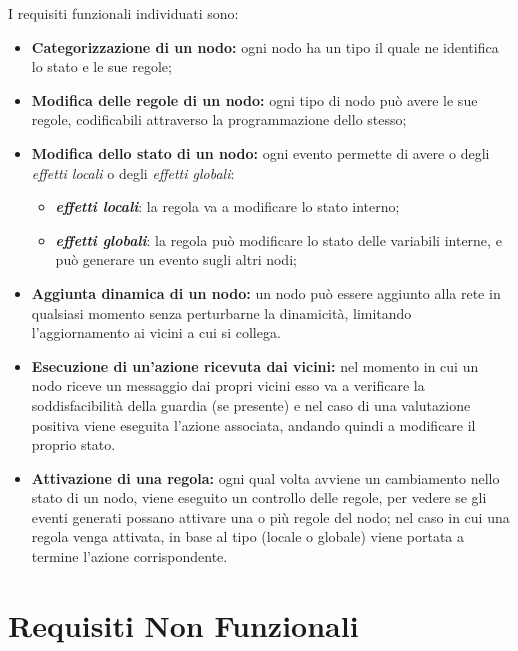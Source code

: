 \documentclass{memoir}
\begin{document}
I requisiti funzionali individuati sono:
\begin{itemize}
\item \textbf{Categorizzazione di un nodo:} ogni nodo ha un tipo il quale ne identifica lo stato e le sue regole;
\item \textbf{Modifica delle regole di un nodo:} ogni tipo di nodo può avere le sue regole, codificabili attraverso la programmazione dello stesso;
\item \textbf{Modifica dello stato di un nodo:} ogni evento permette di avere o degli \textit{effetti locali} o degli \textit{effetti globali}:
	\begin{itemize}
	\item \textit{\textbf{effetti locali}}: la regola va a modificare lo stato interno;
	\item \textit{\textbf{effetti globali}}: la regola può modificare lo stato delle variabili interne, e può generare un evento sugli altri nodi;
	\end{itemize}
\item \textbf{Aggiunta dinamica di un nodo:} un nodo può essere aggiunto alla rete in qualsiasi momento senza perturbarne la dinamicità, limitando l'aggiornamento ai vicini a cui si collega.
\item \textbf{Esecuzione di un'azione ricevuta dai vicini:} nel momento in cui un nodo riceve un messaggio dai propri vicini esso va a verificare la soddisfacibilità della guardia (se presente) e nel caso di una valutazione positiva viene eseguita l'azione associata, andando quindi a modificare il proprio stato.
\item \textbf{Attivazione di una regola:} ogni qual volta avviene un cambiamento nello stato di un nodo, viene eseguito un controllo delle regole, per vedere se gli eventi generati possano attivare una o più regole del nodo; nel caso in cui una regola venga attivata, in base al tipo (locale o globale) viene portata a termine l'azione corrispondente.
\end{itemize}

\section{Requisiti Non Funzionali}
\end{document}
